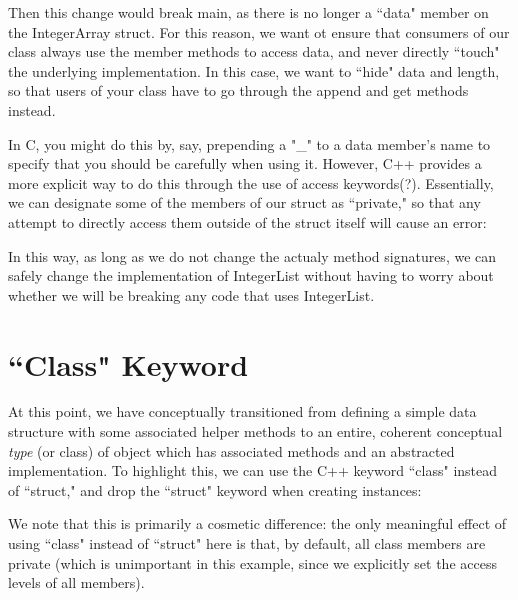 

Then this change would break main, as there is no longer a ``data" member on
the IntegerArray struct. For this reason, we want ot ensure that consumers of
our class always use the member methods to access data, and never directly
``touch" the underlying implementation. In this case, we want to ``hide" data
and length, so that users of your class have to go through the append and get
methods instead.

In C, you might do this by, say, prepending a "\_" to a data member's name to
specify that you should be carefully when using it. However, C++ provides a
more explicit way to do this through the use of access keywords(?).
Essentially, we can designate some of the members of our struct as ``private,"
so that any attempt to directly access them outside of the struct itself will
cause an error:



In this way, as long as we do not change the actualy method signatures, we can
safely change the implementation of IntegerList without having to worry about
whether we will be breaking any code that uses IntegerList.

\section{``Class" Keyword}
At this point, we have conceptually transitioned from defining a simple data
structure with some associated helper methods to an entire, coherent conceptual
\textit{type} (or class) of object which has associated methods and an
abstracted implementation. To highlight this, we can use the C++ keyword
``class" instead of ``struct," and drop the ``struct" keyword when creating
instances:



We note that this is primarily a cosmetic difference: the only meaningful
effect of using ``class" instead of ``struct" here is that, by default, all
class members are private (which is unimportant in this example, since we
explicitly set the access levels of all members).
